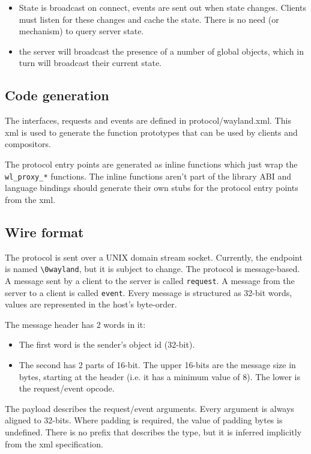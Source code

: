 \documentclass{article}
\begin{document}
\begin{itemize}
\item State is broadcast on connect, events are sent out when state
  changes. Clients must listen for these changes and cache the state.
  There is no need (or mechanism) to query server state.

\item the server will broadcast the presence of a number of global objects,
  which in turn will broadcast their current state.
\end{itemize}

\subsection{Code generation}

The interfaces, requests and events are defined in protocol/wayland.xml.
This xml is used to generate the function prototypes that can be used by
clients and compositors.

The protocol entry points are generated as inline functions which just
wrap the \verb:wl_proxy_*: functions.  The inline functions aren't
part of the library ABI and language bindings should generate their
own stubs for the protocol entry points from the xml.

\subsection{Wire format}

The protocol is sent over a UNIX domain stream socket.  Currently, the
endpoint is named \texttt{\textbackslash0wayland}, but it is subject
to change.  The protocol is message-based.  A message sent by a client
to the server is called \texttt{request}.  A message from the server
to a client is called \texttt{event}.  Every message is structured as
32-bit words, values are represented in the host's byte-order.

The message header has 2 words in it:
\begin{itemize}
\item The first word is the sender's object id (32-bit).
\item The second has 2 parts of 16-bit.  The upper 16-bits are the message
  size in bytes, starting at the header (i.e. it has a minimum value of 8).
  The lower is the request/event opcode.
\end{itemize}

The payload describes the request/event arguments.  Every argument is always
aligned to 32-bits. Where padding is required, the value of padding bytes is
undefined. There is no prefix that describes the type, but it is
inferred implicitly from the xml specification.
\end{document}
